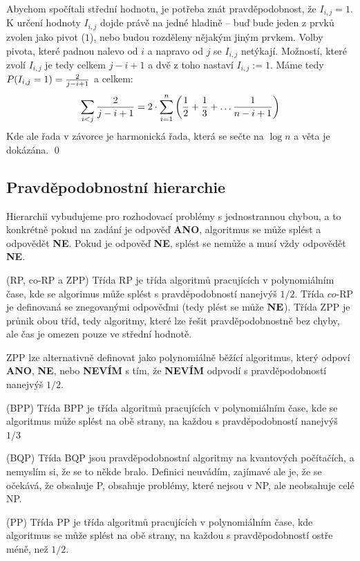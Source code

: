 Abychom spočítali střední hodnotu, je potřeba znát pravděpodobnost, že $I_{i,j}
= 1$. K určení hodnoty $I_{i,j}$ dojde právě na jedné hladině -- buď bude jeden
z prvků zvolen jako pivot ($1$), nebo budou rozděleny nějakým jiným prvkem.
Volby pivota, které padnou nalevo od $i$ a napravo od $j$ se $I_{i,j}$ netýkají.
Možností, které zvolí $I_{i,j}$ je tedy celkem ${j-i+1}$ a dvě z toho nastaví
$I_{i,j} := 1$. Máme tedy $P(I_{i,j} = 1) = {2 \over j-i+1}$ a celkem:
\begin{align}
	\sum_{i < j} {2 \over j-i+1} = 2 \cdot \sum_{i=1}^n \left( {1 \over 2} + {1
		\over 3} +
	\dots {1 \over n-i+1}\right)
\end{align}
Kde ale řada v závorce je harmonická řada, která se sečte na $\log n$ a věta je
dokázána. \qed

\subsection{Pravděpodobnostní hierarchie}

Hierarchii vybudujeme pro rozhodovací problémy s jednostrannou chybou, a to
konkrétně pokud na zadání je odpověď {\bf ANO}, algoritmus se může splést a
odpovědět {\bf NE}. Pokud je odpověď {\bf NE}, splést se nemůže a musí vždy
odpovědět {\bf NE}.

\df (RP, co-RP a ZPP) Třída RP je třída algoritmů pracujících v polynomiálním
čase, kde se algorimus může splést s pravděpodobností nanejvýš $1/2$. Třída
$co$-RP je definovaná se znegovanými odpověďmi (tedy plést se může ${\bf NE}$).
Třída ZPP je průnik obou tříd, tedy algoritmy, které lze řešit
pravděpodobnostně bez chyby, ale čas je omezen pouze ve střední hodnotě. 

\poz ZPP lze alternativně definovat jako polynomiálně běžící algoritmus, který
odpoví {\bf ANO}, {\bf NE}, nebo {\bf NEVÍM} s tím, že {\bf NEVÍM} odpvodí s
pravděpodobností nanejvýš $1/2$.

\df (BPP) Třída BPP je třída algoritmů pracujících v polynomiálním čase, kde se
algoritmus může splést na obě strany, na každou s pravděpodobností nanejvýš
$1/3$

\df (BQP) Třída BQP jsou pravděpodobnostní algoritmy na kvantových počítačích, a
nemyslím si, že se to někde bralo. Definici neuvádím, zajímavé ale je, že se
očekává, že obsahuje P, obsahuje problémy, které nejsou v NP, ale neobsahuje
celé NP.

\df (PP) Třída PP je třída algoritmů pracujících v polynomiálním čase, kde
algoritmus se může splést na obě strany, na každou s pravděpodobností ostře
méně, než $1/2$.

